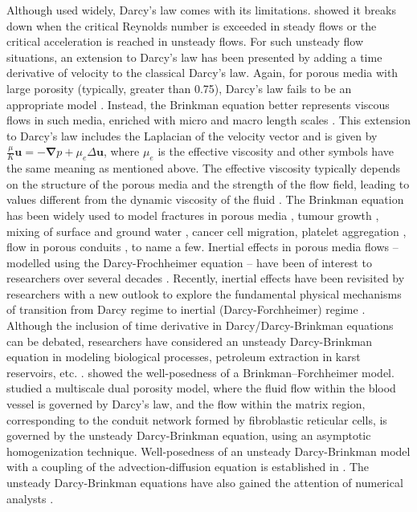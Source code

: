 \documentclass[final,3p,times]{elsarticle}
\theoremstyle{plain}
\theoremstyle{remark}
\theoremstyle{plain}
\theoremstyle{remark}
\begin{document}
Although used widely, Darcy's law comes with its limitations. \citet{khalifa2002new} showed it breaks down when the critical Reynolds number is exceeded in steady flows or the critical acceleration is reached in unsteady flows. For such unsteady flow situations, an extension to Darcy's law has been presented by adding a time derivative of velocity to the classical Darcy's law. Again, for porous media with large porosity (typically, greater than 0.75), Darcy's law fails to be an appropriate model \citep{mccurdy2019convection}. 
Instead, the Brinkman equation better represents viscous flows in such media, enriched with micro and macro length scales \citep{brinkman1949calculation}. This extension to Darcy's law includes the Laplacian of the velocity vector and is given by $ \displaystyle \frac{\mu}{K}\mathbf u = - \boldsymbol{\boldsymbol{\nabla}} p + \mu_e \Delta \mathbf u$, where $\mu_e$ is the effective viscosity and other symbols have the same meaning as mentioned above. The effective viscosity typically depends on the structure of the porous media and the strength of the flow field, leading to values different from the dynamic viscosity of the fluid \citep{vafai2015handbook}. The Brinkman equation has been widely used to model fractures in porous media \citep{morales2017darcy}, tumour growth \citep{ebenbeck2019cahn}, mixing of surface and ground water \cite{layton2002coupling}, cancer cell migration, platelet aggregation \citep{link2020mathematical}, flow in porous conduits \citep{babuvska2010residual}, to name a few. Inertial effects in porous media flows -- modelled using the Darcy-Frochheimer equation \citep{cimolin2013navier} -- have been of interest to researchers over several decades \citep[see][for a review]{koch2001inertial}. Recently, inertial effects have been revisited by researchers with a new outlook to explore the fundamental physical mechanisms of transition from Darcy regime to inertial (Darcy-Forchheimer) regime \citep[see][and refs. therein]{naqvi2025inertial, strzelczyk2025role}. Although the inclusion of time derivative in Darcy/Darcy-Brinkman equations can be debated, researchers have considered an unsteady Darcy-Brinkman equation in modeling biological processes, petroleum extraction in karst reservoirs, etc. \citep[see][and references therein]{kundu2024existence}. \citet{CELEBI2006801} showed the well-posedness of a Brinkman–Forchheimer model. \citet{Girelli_unsteady_DB} studied a multiscale dual porosity model, where the fluid flow within the blood vessel is governed by Darcy's law, and the flow within the matrix region, corresponding to the conduit network formed by fibroblastic reticular cells, is governed by the unsteady Darcy-Brinkman equation, using an asymptotic homogenization technique. Well-posedness of an unsteady Darcy-Brinkman model with a coupling of the advection-diffusion equation is established in \cite{kundu2024existence}. The unsteady Darcy-Brinkman equations have also gained the attention of numerical analysts \citep{hou2016dual, evje2018stokes}.
\end{document}

